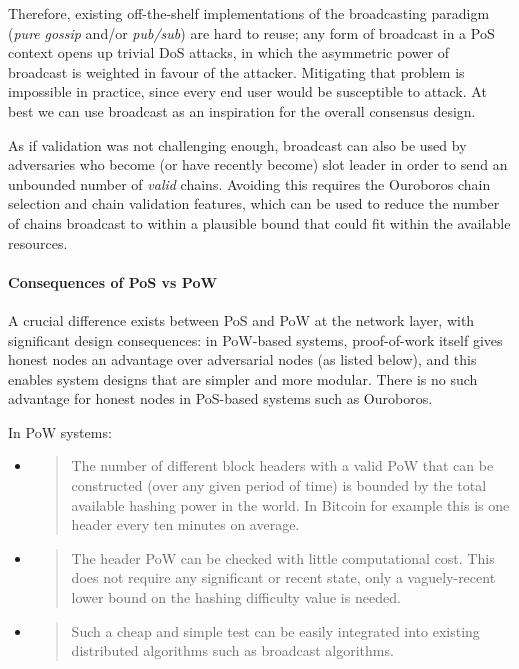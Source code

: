 \documentclass[11pt,a4paper]{article}
\begin{document}
Therefore, existing off-the-shelf implementations of the broadcasting
paradigm (\emph{pure} \emph{gossip} and/or \emph{pub/sub}) are hard to
reuse; any form of broadcast in a PoS context opens up trivial DoS attacks, in
which the asymmetric power of broadcast is weighted in favour of the
attacker. Mitigating that problem is impossible in practice, since every
end user would be susceptible to attack. At best we can use broadcast as
an inspiration for the overall consensus design.

As if validation was not challenging enough, broadcast can also be used
by adversaries who become (or have recently become) slot leader in order
to send an unbounded number of \emph{valid} chains. Avoiding this
requires the Ouroboros chain selection and chain validation features,
which can be used to reduce the number of chains broadcast to within a
plausible bound that could fit within the available resources.

\paragraph{Consequences of PoS vs PoW}

A crucial difference exists between PoS and PoW at the network layer,
with significant design consequences: in PoW-based systems,
proof-of-work itself gives honest nodes an advantage over adversarial
nodes (as listed below), and this enables system designs that are
simpler and more modular. There is no such advantage for honest nodes in
PoS-based systems such as Ouroboros.

In PoW systems:

\begin{itemize}
\item
  \begin{quote}
  The number of different block headers with a valid PoW that can be
  constructed (over any given period of time) is bounded by the total
  available hashing power in the world. In Bitcoin for example this is
  one header every ten minutes on average.
  \end{quote}
\item
  \begin{quote}
  The header PoW can be checked with little computational cost. This
  does not require any significant or recent state, only a
  vaguely-recent lower bound on the hashing difficulty value is needed.
  \end{quote}
\item
  \begin{quote}
  Such a cheap and simple test can be easily integrated into existing
  distributed algorithms such as broadcast algorithms.
  \end{quote}
\end{itemize}
\end{document}
